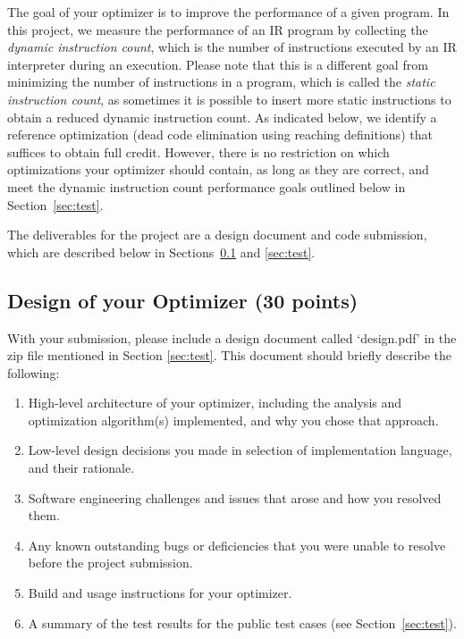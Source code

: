 \documentclass[12pt]{article}
\begin{document}
The goal of your optimizer is to improve the performance of a given program.
In this project, we measure the performance of an IR program by collecting the \emph{dynamic instruction count},
which is the number of instructions executed by an IR interpreter during an execution.
Please note that this is a different goal from minimizing the number of instructions in a program,
which is called the \emph{static instruction count},
as sometimes it is possible to insert more static instructions to
obtain a reduced dynamic instruction count.
As indicated below, we identify a reference optimization (dead code
elimination using reaching definitions) that suffices to obtain full
credit.  However, there is no restriction on which optimizations your optimizer should
contain, as long as they are correct, and meet the dynamic instruction count
performance goals outlined below in Section~\ref{sec:test}.

The deliverables for the project are a design document and code
submission, which are described below in Sections~\ref{sec:opt} and \ref{sec:test}.

\subsection{Design of your Optimizer (30 points)}\label{sec:opt}

With your submission, please include a design document called
`design.pdf' in the zip file mentioned in Section \ref{sec:test}.
%
This document should briefly describe the following:
%
\begin{enumerate}
\item High-level architecture of your optimizer, including the
  analysis and optimization
  algorithm(s) implemented, and why you chose that approach.
\item Low-level design decisions you made in selection of
  implementation language, and their rationale.
\item Software engineering challenges and issues that arose and how
  you resolved them.
\item Any known outstanding bugs or deficiencies that you were unable
  to   resolve before the project submission.
       \item Build and usage instructions for your optimizer.
        \item A summary of the test results for the public test cases
          (see Section~\ref{sec:test}).
 \end{enumerate}
   
\end{document}
